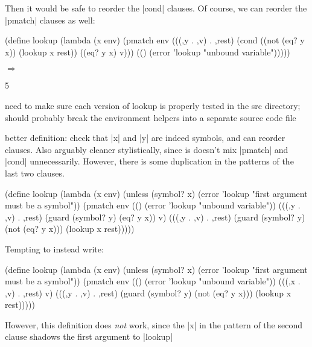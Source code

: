 Then it would be safe to reorder the \scheme|cond| clauses.  Of course, we can
reorder the \scheme|pmatch| clauses as well:

\begin{schemedisplay}
(define lookup
  (lambda (x env)
    (pmatch env
      (((,y . ,v) . ,rest)
       (cond
         ((not (eq? y x)) (lookup x rest))
         ((eq? y x) v)))
      (() (error 'lookup "unbound variable")))))
\end{schemedisplay}

\noindent{} $\Rightarrow$
\begin{schemeresponsebox}5\end{schemeresponsebox}

need to make sure each version of lookup is properly tested in the src directory;
should probably break the environment helpers into a separate source code file


better definition: check that \scheme|x| and \scheme|y| are indeed
symbols, and can reorder clauses.  Also arguably cleaner
stylistically, since is doesn't mix \scheme|pmatch| and \scheme|cond|
unnecessarily.  However, there is some duplication in the patterns of
the last two clauses.

\begin{schemedisplay}
(define lookup
  (lambda (x env)
    (unless (symbol? x)
      (error 'lookup "first argument must be a symbol"))
    (pmatch env
      (() (error 'lookup "unbound variable"))
      (((,y . ,v) . ,rest) (guard (symbol? y) (eq? y x))
       v)
      (((,y . ,v) . ,rest) (guard (symbol? y) (not (eq? y x)))
       (lookup x rest)))))
\end{schemedisplay}

Tempting to instead write:

\begin{schemedisplay}
(define lookup
  (lambda (x env)
    (unless (symbol? x)
      (error 'lookup "first argument must be a symbol"))
    (pmatch env
      (() (error 'lookup "unbound variable"))
      (((,x . ,v) . ,rest)
       v)
      (((,y . ,v) . ,rest) (guard (symbol? y) (not (eq? y x)))
       (lookup x rest)))))
\end{schemedisplay}

However, this definition does \emph{not} work, since the \scheme|x| in
the pattern of the second clause shadows the first argument to
\scheme|lookup|


